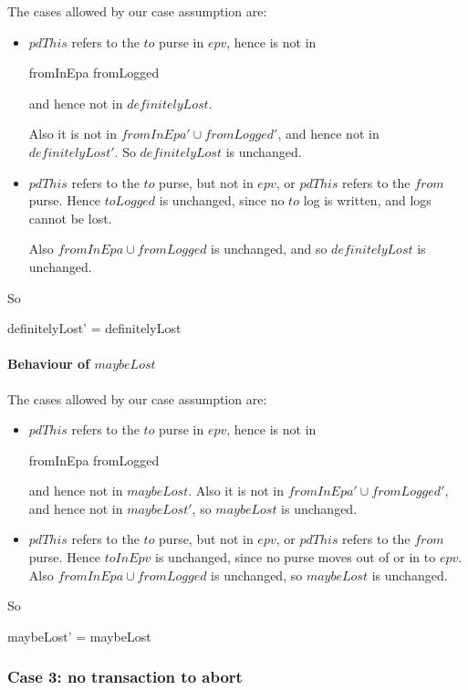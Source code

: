 The cases allowed by our case assumption are:
\begin{itemize}
\item $pdThis$ refers to the $to$ purse in $epv$, hence is not in
  \begin{gzed}
  fromInEpa \cup fromLogged
  \end{gzed}
  and hence not in $definitelyLost$.

  Also it is not in $fromInEpa' \cup fromLogged'$, and hence not in
  $definitelyLost'$.  So $definitelyLost$ is unchanged.
\item $pdThis$ refers to the $to$ purse, but not in $epv$, or $pdThis$
  refers to the $from$ purse.  Hence $toLogged$ is unchanged, since no
  $to$ log is written, and logs cannot be lost.

  Also $fromInEpa \cup fromLogged$ is unchanged, and so
  $definitelyLost$ is unchanged.
\end{itemize}
So
\begin{gzed}
definitelyLost' = definitelyLost
\end{gzed}

\paragraph{Behaviour of $maybeLost$}

The cases allowed by our case assumption are:
\begin{itemize}
\item $pdThis$ refers to the $to$ purse in $epv$, hence is not in
  \begin{gzed}
  fromInEpa \cup fromLogged
  \end{gzed}
  and hence not in $maybeLost$.  Also it is not in $fromInEpa' \cup
  fromLogged'$, and hence not in $maybeLost'$, so $maybeLost$ is
  unchanged.
\item $pdThis$ refers to the $to$ purse, but not in $epv$, or $pdThis$
  refers to the $from$ purse.  Hence $toInEpv$ is unchanged, since no
  purse moves out of or in to $epv$.  Also $fromInEpa \cup fromLogged$
  is unchanged, so $maybeLost$ is unchanged.
\end{itemize}
So
\begin{gzed}
maybeLost' = maybeLost
\end{gzed}

\subsubsection{Case 3: no transaction to abort}
\label{abort-no-transaction}

